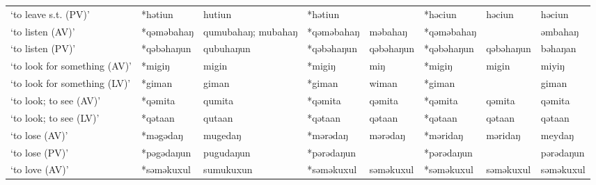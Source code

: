 \begin{landscape}
\begin{longtable}[c]{@{}p{3cm}<{\raggedright}p{2.75cm}<{\raggedright}p{2.75cm}<{\raggedright}p{2.75cm}<{\raggedright}p{2.75cm}<{\raggedright}p{2.75cm}<{\raggedright}p{2.75cm}<{\raggedright}p{2.75cm}<{\raggedright}@{}}
`to leave s.t. (PV)'                                 & *hətiun            & hutiun                         & *hətiun            &                            & *həciun          & həciun                   & həciun                            \\
`to listen (AV)'                                     & *qəməbahaŋ         & qumubahaŋ; mubahaŋ             & *qəməbahaŋ         & məbahaŋ                    & *qəməbahaŋ       &                          & əmbahaŋ                           \\
`to listen (PV)'                                     & *qəbəhaŋun         & qubuhaŋun                      & *qəbəhaŋun         & qəbəhaŋun                  & *qəbəhaŋun       & qəbəhaŋun                & bəhaŋan                           \\
`to look for something (AV)'                         & *migiŋ             & migin                          & *migiŋ             & miŋ                        & *migiŋ           & migin                    & miyiŋ                             \\
`to look for something (LV)'                         & *giman             & giman                          & *giman             & wiman                      & *giman           &                          & giman                             \\
`to look; to see (AV)'                               & *qəmita            & qumita                         & *qəmita            & qəmita                     & *qəmita          & qəmita                   & qəmita                            \\
`to look; to see (LV)'                               & *qətaan            & qutaan                         & *qətaan            & qətaan                     & *qətaan          & qətaan                   & qətaan                            \\
`to lose (AV)'                                       & *məgədaŋ           & mugedaŋ                        & *mərədaŋ           & mərədaŋ                    & *məridaŋ         & məridaŋ                  & meydaŋ                            \\
`to lose (PV)'                                       & *pəgədaŋun         & pugudaŋun                      & *pərədaŋun         &                            & *pərədaŋun       &                          & pərədaŋun                         \\
`to love (AV)'                                       & *səməkuxul         & sumukuxun                      & *səməkuxul         & səməkuxul                  & *səməkuxul       & səməkuxul                & səməkuxul                         \\

\end{longtable}
\end{landscape}
